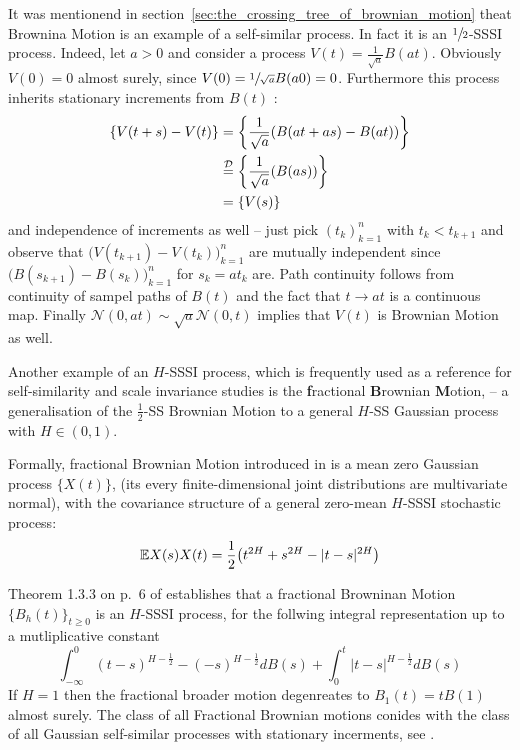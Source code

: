 It was mentionend in section~\ref{sec:the_crossing_tree_of_brownian_motion} theat Brownina
Motion is an example of a self-similar process. In fact it is an $\sfrac{1}{2}$-SSSI process.
Indeed, let $a>0$ and consider a process $V(t) = \frac{1}{\sqrt{a}} B(at)$. Obviously $V(0) = 0$ almost
surely, since $V(0) = \sfrac{1}{\sqrt{a}} B(a 0) = 0$. Furthermore this process inherits
stationary increments from $B(t)$ : \begin{align*}
	\{ V(t+s) - V(t) \} &= \biggl\{ \frac{1}{\sqrt{a}}( B(at+as) - B(at) ) \biggr\}\\
	&\overset{\mathcal{D}}{=} \biggl\{ \frac{1}{\sqrt{a}}( B(as) ) \biggr\} \\
	&= \{ V(s) \}
\end{align*}
and independence of increments as well -- just pick $(t_k)_{k=1}^n$ with $t_k<t_{k+1}$ and
observe that $\bigl(V(t_{k+1}) - V(t_k)\bigr)_{k=1}^n$ are mutually independent since
$\bigl(B(s_{k+1}) - B(s_k)\bigr)_{k=1}^n$ for $s_k = a t_k$ are. Path continuity follows
from continuity of sampel paths of $B(t)$ and the fact that $t\to a t$ is a continuous map. 
Finally $\mathcal{N}(0, at) \sim \sqrt{a} \mathcal{N}(0,t)$ implies that $V(t)$ is Brownian
Motion as well.

Another example of an $H$-SSSI process, which is frequently used as a reference for
self-similarity and scale invariance studies is the \textbf{f}ractional \textbf{B}rownian
\textbf{M}otion, -- a generalisation of the $\tfrac{1}{2}$-SS Brownian Motion to a general
$H$-SS Gaussian process with $H\in (0, 1)$.

Formally, fractional Brownian Motion introduced in \cite{doi:10.1137/1010093} is a
mean zero Gaussian process $\bigl\{X(t)\bigr\}$, (its every finite-dimensional joint
distributions are multivariate normal), with the covariance structure of a general
zero-mean $H$-SSSI stochastic process:
\[ \mathbb{E} X(s) X(t) = \frac{1}{2} \bigl(t^{2H} + s^{2H} - |t-s|^{2H}\bigr) \]

Theorem 1.3.3 on p.~6 of \cite{embrechtsselfsimilar} establishes that a fractional
Browninan Motion $\{B_h(t)\}_{t\geq 0}$ is an $H$-SSSI process, for the follwing integral
representation up to a mutliplicative constant
\[
\int_{-\infty}^0 (t-s)^{H-\tfrac{1}{2}} - (-s)^{H-\tfrac{1}{2}} dB(s)
+ \int_0^t |t-s|^{H-\tfrac{1}{2}} dB(s)
\]
If $H = 1$ then the fractional broader motion degenreates to $B_1(t) = tB(1)$ almost
surely. The class of all Fractional Brownian motions conides with the class of all
Gaussian self-similar processes with stationary incerments, see \cite{embrechtsselfsimilar}. 

